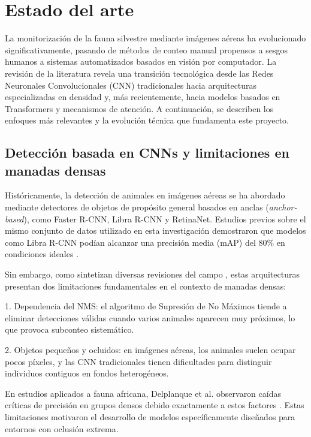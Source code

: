 \section{Estado del arte}

La monitorización de la fauna silvestre mediante imágenes aéreas ha evolucionado significativamente, pasando de métodos de conteo manual propensos a sesgos humanos a sistemas automatizados basados en visión por computador. La revisión de la literatura revela una transición tecnológica desde las Redes Neuronales Convolucionales (CNN) tradicionales hacia arquitecturas especializadas en densidad y, más recientemente, hacia modelos basados en Transformers y mecanismos de atención. A continuación, se describen los enfoques más relevantes y la evolución técnica que fundamenta este proyecto.

\subsection{Detección basada en CNNs y limitaciones en manadas densas}

Históricamente, la detección de animales en imágenes aéreas se ha abordado mediante detectores de objetos de propósito general basados en anclas (\textit{anchor-based}), como Faster R-CNN, Libra R-CNN y RetinaNet. Estudios previos sobre el mismo conjunto de datos utilizado en esta investigación demostraron que modelos como Libra R-CNN podían alcanzar una precisión media (mAP) del 80\% en condiciones ideales \cite{delplanque-data}.

Sin embargo, como sintetizan diversas revisiones del campo \cite{xu-review}, estas arquitecturas presentan dos limitaciones fundamentales en el contexto de manadas densas:

1. Dependencia del NMS: el algoritmo de Supresión de No Máximos tiende a eliminar detecciones válidas cuando varios animales aparecen muy próximos, lo que provoca subconteo sistemático.

2. Objetos pequeños y ocluidos: en imágenes aéreas, los animales suelen ocupar pocos píxeles, y las CNN tradicionales tienen dificultades para distinguir individuos contiguos en fondos heterogéneos.

En estudios aplicados a fauna africana, Delplanque et al. observaron caídas críticas de precisión en grupos densos debido exactamente a estos factores \cite{delplanque-data}. Estas limitaciones motivaron el desarrollo de modelos específicamente diseñados para entornos con oclusión extrema.

